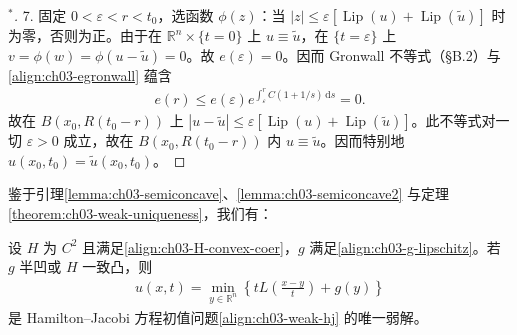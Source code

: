 \documentclass[../../main.tex]{subfiles}
\begin{document}
\begin{proof}[$^*$]
7. 固定 $0<\varepsilon<r<t_0$，选函数 $\phi(z)$：当 $|z|\leqslant\varepsilon[\operatorname{Lip}(u)+\operatorname{Lip}(\widetilde{u})]$ 时为零，否则为正。由于在 $\mathbb{R}^n\times\{t=0\}$ 上 $u\equiv\widetilde{u}$，在 $\{t=\varepsilon\}$ 上 $v=\phi(w)=\phi(u-\widetilde{u})=0$。故 $e(\varepsilon)=0$。因而 Gronwall 不等式（\S B.2）与\eqref{align:ch03-egronwall} 蕴含
\begin{align*}
e(r)\leqslant e(\varepsilon)e^{\int_\varepsilon^r C(1+1/s)\,\mathrm{d}s}=0.
\end{align*}
故在 $B(x_0,R(t_0-r))$ 上 $|u-\widetilde{u}|\leqslant\varepsilon[\operatorname{Lip}(u)+\operatorname{Lip}(\widetilde{u})]$。此不等式对一切 $\varepsilon>0$ 成立，故在 $B(x_0,R(t_0-r))$ 内 $u\equiv\widetilde{u}$。因而特别地 $u(x_0,t_0)=\widetilde{u}(x_0,t_0)$。
\end{proof}

鉴于引理\cref{lemma:ch03-semiconcave}、\cref{lemma:ch03-semiconcave2} 与定理\cref{theorem:ch03-weak-uniqueness}，我们有：

\begin{theorem}\label{theorem:ch03-hopf-lax-weak}设 $H$ 为 $C^2$ 且满足\eqref{align:ch03-H-convex-coer}，$g$ 满足\eqref{align:ch03-g-lipschitz}。若 $g$ 半凹或 $H$ 一致凸，则
\begin{align*}
u(x,t)=\min_{y\in\mathbb{R}^n}\left\{tL\!\left(\frac{x-y}{t}\right)+g(y)\right\}
\end{align*}
是 Hamilton--Jacobi 方程初值问题\eqref{align:ch03-weak-hj} 的唯一弱解。
\end{theorem}
\end{document}
